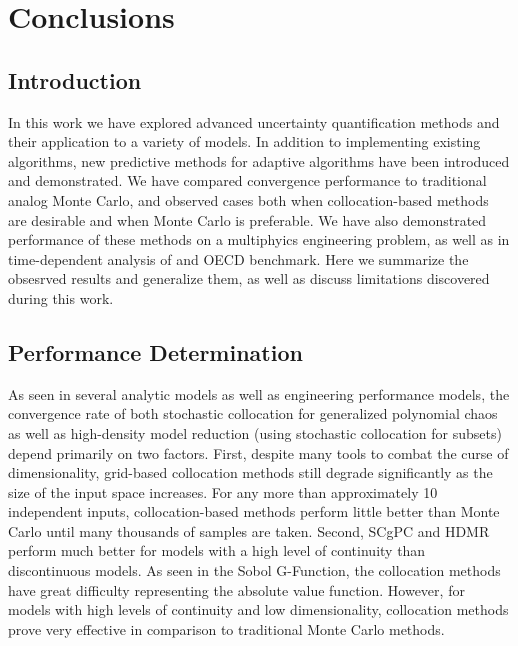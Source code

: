 
\chapter{Conclusions} %

\label{ch:concl} %



\section{Introduction}
In this work we have explored advanced uncertainty quantification methods and their application to a variety of models.
In addition to implementing existing algorithms, new predictive methods for adaptive algorithms have been introduced
and demonstrated.  We have compared convergence performance to traditional analog Monte Carlo, and observed cases both
when collocation-based methods are desirable and when Monte Carlo is preferable.  We have also demonstrated performance
of these methods on a multiphyics engineering problem, as well as in time-dependent analysis of and OECD benchmark.  Here we
summarize the obsesrved results and generalize them, as well as discuss limitations discovered during this work.

\section{Performance Determination}
As seen in several analytic models as well as engineering performance models, the convergence rate of both stochastic collocation
for generalized polynomial chaos as well as high-density model reduction (using stochastic collocation for subsets) depend primarily
on two factors. 
First, despite many tools to combat the curse of dimensionality, grid-based collocation methods still degrade
significantly as the size of the input space increases.  For any more than approximately 10 independent inputs, collocation-based
methods perform little better than Monte Carlo until many thousands of samples are taken.  Second, SCgPC and HDMR perform much
better for models with a high level of continuity than discontinuous models.  As seen in the Sobol G-Function, the collocation
methods have great difficulty representing the absolute value function.  
However, for models with high levels of continuity and low dimensionality, collocation methods prove very effective in comparison
to traditional Monte Carlo methods.

